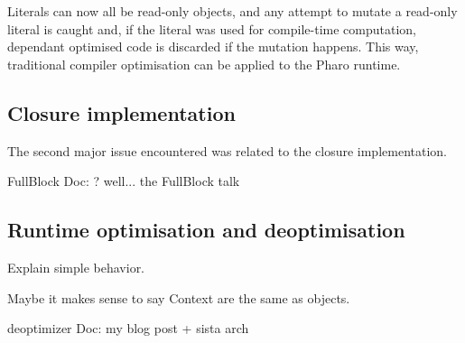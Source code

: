 \documentclass[a4paper,12pt,twoside]{../includes/ThesisStyle}
\begin{document}
Literals can now all be read-only objects, and any attempt to mutate a read-only literal is caught and, if the literal was used for compile-time computation, dependant optimised code is discarded if the mutation happens. This way, traditional compiler optimisation can be applied to the Pharo runtime.

\subsection{Closure implementation}

The second major issue encountered was related to the closure implementation. 

FullBlock
Doc: ? well... the FullBlock talk

\subsection{Runtime optimisation and deoptimisation}

Explain simple behavior.

Maybe it makes sense to say Context are the same as objects.

deoptimizer 
Doc: my blog post + sista arch


\ifx\wholebook\relax\else
    
\end{document}
